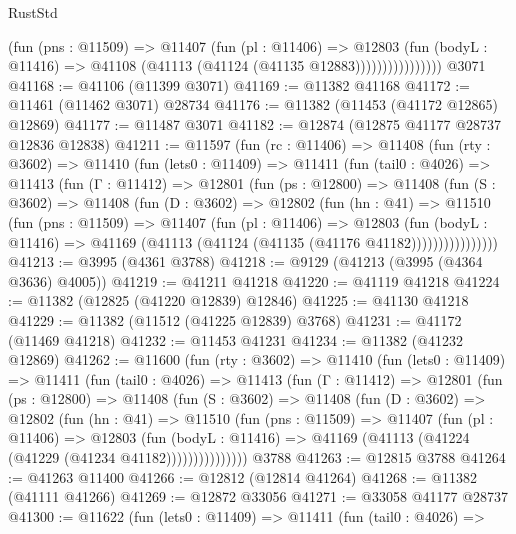 \begin{lexlean}{RustStd}
\begin{coremodule}
                        (fun (pns : @11509) =>
                        @11407
                          (fun (pl : @11406) =>
                          @12803
                            (fun (bodyL : @11416) =>
                            @41108 (@41113 (@41124 (@41135 @12883))))))))))))))))
    @3071
@41168 := @41106 (@11399 @3071)
@41169 := @11382 @41168
@41172 := @11461 (@11462 @3071) @28734
@41176 := @11382 (@11453 (@41172 @12865) @12869)
@41177 := @11487 @3071
@41182 := @12874 (@12875 @41177 @28737 @12836 @12838)
@41211 := @11597
    (fun (rc : @11406) =>
    @11408
      (fun (rty : @3602) =>
      @11410
        (fun (lets0 : @11409) =>
        @11411
          (fun (tail0 : @4026) =>
          @11413
            (fun (Γ : @11412) =>
            @12801
              (fun (ps : @12800) =>
              @11408
                (fun (S : @3602) =>
                @11408
                  (fun (D : @3602) =>
                  @12802
                    (fun (hn : @41) =>
                    @11510
                      (fun (pns : @11509) =>
                      @11407
                        (fun (pl : @11406) =>
                        @12803
                          (fun (bodyL : @11416) =>
                          @41169 (@41113 (@41124 (@41135 (@41176 @41182))))))))))))))))
@41213 := @3995 (@4361 @3788)
@41218 := @9129 (@41213 (@3995 (@4364 @3636) @4005))
@41219 := @41211 @41218
@41220 := @41119 @41218
@41224 := @11382 (@12825 (@41220 @12839) @12846)
@41225 := @41130 @41218
@41229 := @11382 (@11512 (@41225 @12839) @3768)
@41231 := @41172 (@11469 @41218)
@41232 := @11453 @41231
@41234 := @11382 (@41232 @12869)
@41262 := @11600
    (fun (rty : @3602) =>
    @11410
      (fun (lets0 : @11409) =>
      @11411
        (fun (tail0 : @4026) =>
        @11413
          (fun (Γ : @11412) =>
          @12801
            (fun (ps : @12800) =>
            @11408
              (fun (S : @3602) =>
              @11408
                (fun (D : @3602) =>
                @12802
                  (fun (hn : @41) =>
                  @11510
                    (fun (pns : @11509) =>
                    @11407
                      (fun (pl : @11406) =>
                      @12803
                        (fun (bodyL : @11416) =>
                        @41169 (@41113 (@41224 (@41229 (@41234 @41182)))))))))))))))
    @3788
@41263 := @12815 @3788
@41264 := @41263 @11400
@41266 := @12812 (@12814 @41264)
@41268 := @11382 (@41111 @41266)
@41269 := @12872 @33056
@41271 := @33058 @41177 @28737
@41300 := @11622
    (fun (lets0 : @11409) =>
    @11411
      (fun (tail0 : @4026) =>

\end{coremodule}
\end{lexlean}
